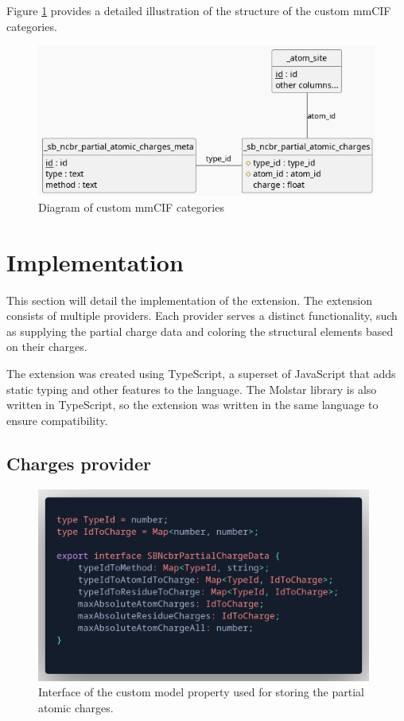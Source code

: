 \documentclass[
  digital,     %
  oneside,     %
  nosansbold,  %
  nocolorbold, %
  lof,         %
  lot,         %
]{fithesis4}
\begin{document}
Figure \ref{fig:mmcif_erd} provides a detailed illustration of the structure of the custom mmCIF categories.

\begin{figure}
  \begin{center}
    \includegraphics[width=12cm]{figures/mmcif_erd.png}
  \end{center}
  \caption{Diagram of custom mmCIF categories}
  \label{fig:mmcif_erd}
\end{figure}

\section{Implementation}
\label{section:implementation}

This section will detail the implementation of the extension. The extension consists of multiple providers. Each provider serves a distinct functionality, such as supplying the partial charge data and coloring the structural elements based on their charges.

The extension was created using TypeScript, a superset of JavaScript that adds static typing and other features to the language. The Molstar library is also written in TypeScript, so the extension was written in the same language to ensure compatibility.

\subsection{Charges provider}
\label{subsection:charges_provider}

\begin{figure}
  \begin{center}
    \includegraphics[width=11cm]{figures/charge_data_structure.png}
  \end{center}
  \caption{Interface of the custom model property used for storing the partial atomic charges.}
  \label{figure:charge_data_structure}
\end{figure}
\end{document}
